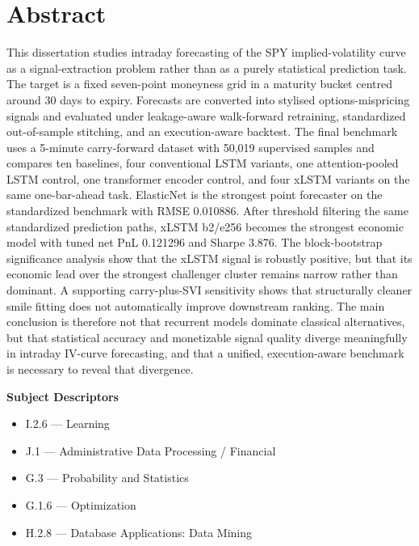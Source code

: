 \documentclass[12pt]{report}
\begin{document}
\cleardoublepage
\setcounter{page}{1}

\chapter*{Abstract}
This dissertation studies intraday forecasting of the SPY implied-volatility curve as a signal-extraction problem rather than as a purely statistical prediction task. The target is a fixed seven-point moneyness grid in a maturity bucket centred around 30 days to expiry. Forecasts are converted into stylised options-mispricing signals and evaluated under leakage-aware walk-forward retraining, standardized out-of-sample stitching, and an execution-aware backtest. The final benchmark uses a 5-minute carry-forward dataset with 50,019 supervised samples and compares ten baselines, four conventional LSTM variants, one attention-pooled LSTM control, one transformer encoder control, and four xLSTM variants on the same one-bar-ahead task. ElasticNet is the strongest point forecaster on the standardized benchmark with RMSE 0.010886. After threshold filtering the same standardized prediction paths, xLSTM b2/e256 becomes the strongest economic model with tuned net PnL 0.121296 and Sharpe 3.876. The block-bootstrap significance analysis show that the xLSTM signal is robustly positive, but that its economic lead over the strongest challenger cluster remains narrow rather than dominant. A supporting carry-plus-SVI sensitivity shows that structurally cleaner smile fitting does not automatically improve downstream ranking. The main conclusion is therefore not that recurrent models dominate classical alternatives, but that statistical accuracy and monetizable signal quality diverge meaningfully in intraday IV-curve forecasting, and that a unified, execution-aware benchmark is necessary to reveal that divergence.

\vspace{0.8em}
\noindent\textbf{Subject Descriptors}
\begin{itemize}[leftmargin=1.8cm,itemsep=0.2em,topsep=0.2em]
    \item I.2.6 --- Learning
    \item J.1 --- Administrative Data Processing / Financial
    \item G.3 --- Probability and Statistics
    \item G.1.6 --- Optimization
    \item H.2.8 --- Database Applications: Data Mining
\end{itemize}
\end{document}
